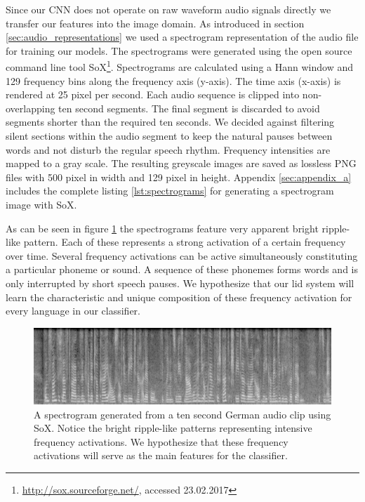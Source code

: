 	Since our CNN does not operate on raw waveform audio signals directly we transfer our features into the image domain. As introduced in section \ref{sec:audio_representations} we used a spectrogram representation of the audio file for training our models. The spectrograms were generated using the open source command line tool SoX\footnote{\url{http://sox.sourceforge.net/}, accessed 23.02.2017}. Spectrograms are calculated using a Hann window and 129 frequency bins along the frequency axis (y-axis). The time axis (x-axis) is rendered at 25 pixel per second. Each audio sequence is clipped into non-overlapping ten second segments. The  final segment is discarded to avoid segments shorter than the required ten seconds. We decided against filtering silent sections within the audio segment to keep the natural pauses between words and not disturb the regular speech rhythm. Frequency intensities are mapped to a gray scale. The resulting greyscale images are saved as lossless PNG files with 500 pixel in width and 129 pixel in height. Appendix \ref{sec:appendix_a} includes the complete listing \ref{lst:spectrograms} for generating a spectrogram image with SoX.
	
	As can be seen in figure \ref{fig:spectrogram} the spectrograms feature very apparent bright ripple-like pattern. Each of these represents a strong activation of a certain frequency over time. Several frequency activations can be active simultaneously constituting a particular phoneme or sound. A sequence of these phonemes forms words and is only interrupted by short speech pauses. We hypothesize that our \ac{lid} system will learn the characteristic and unique composition of these frequency activation for every language in our classifier. 

	
	\begin{figure}[]
  		\centering
    	\includegraphics[width=\textwidth,keepaspectratio]{img/spectrogram.png}
    	\caption{A spectrogram generated from a ten second German audio clip  using SoX. Notice the bright ripple-like patterns representing intensive frequency activations. We hypothesize that these frequency activations will serve as the main features for the classifier.}
    	\label{fig:spectrogram}
	\end{figure}
	

